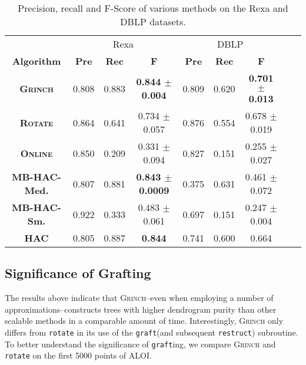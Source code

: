 \documentclass{article} \usepackage[utf8]{inputenc} \usepackage[T1]{fontenc}    \usepackage{hyperref}       \usepackage{url}            \usepackage{booktabs}       \usepackage{amsfonts}       \usepackage{nicefrac}       \usepackage{microtype}      \usepackage{geometry}
\newcommand{\alg}{\textsc{Grinch}\xspace}
\newcommand{\algrotate}{\textsc{Rotate}\xspace}
\newcommand{\greedy}{\textsc{Online}\xspace}
\newcommand{\exact}{\textsc{HAC}\xspace}
\newcommand{\mbhac}{\textsc{MB-HAC}\xspace}
\newcommand{\graft}{\texttt{graft}\xspace}
\newcommand{\grafting}{\texttt{graft}ing\xspace}
\newcommand{\rotate}{\texttt{rotate}\xspace}
\newcommand{\rst}{\texttt{restruct}\xspace}
\begin{document}
\begin{table*}[t]
	\centering
	\begin{tabular}{ c c c c c c c c c}
		\hline
	            & \multicolumn{3}{c}{Rexa}                  & \multicolumn{3}{c}{DBLP} \\
		\textbf{Algorithm} & \textbf{Pre} & \textbf{Rec}  & \textbf{F} &  \textbf{Pre} & \textbf{Rec}  & \textbf{F} \\
		\hline
		\textbf{\alg}           &  0.808 &	0.883 &	\bf 0.844 $\pm$ 0.004  & 0.809 & 0.620 & \bf 0.701 $\pm$ 0.013\\
		\textbf{\algrotate}      & 0.864 &	0.641 &	0.734 $\pm$ 0.057       & 0.876 & 0.554 & 0.678 $\pm$ 0.019 \\
		\textbf{\greedy}       & 0.850 &	0.209 &	0.331 $\pm$  0.094    & 0.827 &	0.151 &	0.255 $\pm$ 0.027  \\
		\textbf{\mbhac-Med.}         & 0.807 &	0.881 &	\bf 0.843 $\pm$ 0.0009   & 0.375 & 0.631 & 0.461 $\pm$	0.072   \\
		\textbf{\mbhac-Sm.}        & 0.922 &	0.333 &	0.483  $\pm$ 0.061   & 0.697 & 0.151 &0.247 $\pm$ 0.004  \\
		\hline
		\textbf{\exact}       & 0.805 &	0.887 &	\bf 0.844      &  0.741 &	0.600 &	0.664 \\
		\hline
	\end{tabular}
	\caption{Precision, recall and F-Score of various methods on the Rexa and DBLP datasets.}
	\label{tab:acorefres}
\end{table*}
 
\subsection{Significance of Grafting}
\label{subsec:sig-graft}
The results above indicate that \alg--even when employing a number
of approximations--constructs trees with higher dendrogram purity than
other scalable methods in a comparable amount of time. Interestingly,
\alg only differs from \rotate in its use of the \graft (and
subsequent \rst) subroutine. To better understand the
significance of \grafting, we compare \alg and \rotate on the
first 5000 points of ALOI.
\end{document}
